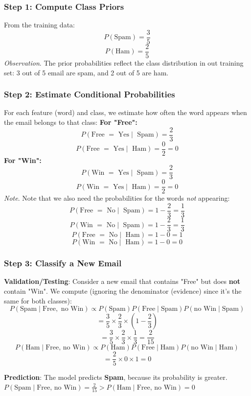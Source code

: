 \documentclass[a4paper]{article}
\theoremstyle{definition}
\begin{document}
\subsubsection{Step 1: Compute Class Priors}
From the training data:
\[
  P(\text{Spam}) = \frac{3}{5}
\]
\[
  P(\text{Ham}) = \frac{2}{5}
\]
\textit{Observation}. The prior probabilities reflect the class distribution in out training set: 3 out of 5 email are spam,
and 2 out of 5 are ham.
\subsubsection{Step 2: Estimate Conditional Probabilities}
For each feature (word) and class, we estimate how often the word appears when the email belongs to that class:
\vspace{1em}
\noindent
\newline
\textbf{For "Free":}
\[
  P(\text{Free } = \text{ Yes} \mid \text{ Spam}) = \frac{2}{3}
\]
\[
  P(\text{Free } = \text{ Yes} \mid \text{ Ham}) = \frac{0}{2} = 0
\]
\textbf{For "Win":}
\[
  P(\text{Win } = \text{ Yes} \mid \text{ Spam}) = \frac{2}{3}
\]
\[
  P(\text{Win } = \text{ Yes} \mid \text{ Ham}) = \frac{0}{2} = 0
\]
\textit{Note}. Note that we also need the probabilities for the words \textit{not} appearing:
\[
  P(\text{Free } = \text{ No} \mid \text{ Spam}) = 1 - \frac{2}{3} = \frac{1}{3}
\]
\[
  P(\text{Win } = \text{ No} \mid \text{ Spam}) = 1 - \frac{2}{3} = \frac{1}{3}
\]
\[
  P(\text{Free } = \text{ No} \mid \text{ Ham}) = 1 - 0 = 1 
\]
\[
  P(\text{Win } = \text{ No} \mid \text{ Ham}) = 1 - 0 = 0
\]
\subsubsection{Step 3: Classify a New Email}
\textbf{Validation/Testing}: Consider a new email that contains "Free" but does \textbf{not} contain "Win".
\vspace{1em}
\noindent
\newline
We compute (ignoring the denominator (evidence) since it's the same for both classes):
\[
  P(\text{Spam} \mid \text{Free}, \text{ no Win}) \propto P(\text{Spam}) P(\text{Free} \mid \text{Spam}) P(\text{no Win} \mid \text{Spam})
\]
\[
  = \frac{3}{5} \times \frac{2}{3} \times (1 - \frac{2}{3})
\]
\[
  = \frac{3}{5} \times \frac{2}{3} \times \frac{1}{3} = \frac{2}{15}
\]
\[
  P(\text{Ham}\mid\text{Free, no Win}) \propto P(\text{Ham}) P(\text{Free}\mid\text{Ham}) P(\text{no Win}\mid\text{Ham})
\]
\[
  = \frac{2}{5} \times 0 \times 1 = 0
\]
\begin{tcolorbox}[
    colback=magenta!15!white,
    colframe=magenta!15!white,
    boxrule=0pt,
    arc=0pt,
    halign=center
]
    \textbf{Prediction}: The model predicts \textbf{Spam}, because its probability is greater.\\[0.6em]
    \( P(\text{Spam} \mid \text{Free, no Win}) = \frac{2}{15} > P(\text{Ham} \mid \text{Free, no Win}) = 0 \)
\end{tcolorbox}
\end{document}
